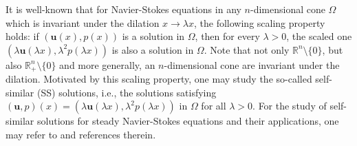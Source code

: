 \documentclass[reqno,12pt]{amsart}
\renewcommand{\div}{{\rm div \thinspace }}
\newcommand{\Bu}{{\boldsymbol{u}}}
\newcommand{\Be}{{\boldsymbol{e}}}
\begin{document}

 It is well-known that for Navier-Stokes equations in any $n$-dimensional cone $\Omega$ which is invariant under the dilation $x\to\lambda x$, the following scaling property holds: if $(\Bu(x),p(x))$ is a solution in $\Omega$, then for every $\lambda>0$, the scaled one $(\lambda \Bu(\lambda x), \lambda^2 p(\lambda x))$ is also a solution in $\Omega$. Note that not only $\mathbb{R}^n\setminus\{0\}$, but also $\mathbb{R}^n_+\setminus\{0\}$ and more generally, an $n$-dimensional cone are invariant under the dilation. 
 Motivated by this scaling property, one may study the so-called self-similar (SS) solutions, i.e., the solutions satisfying
	$(\Bu, p)(x)=(\lambda \Bu(\lambda x), \lambda^2 p(\lambda x))$ in $\Omega$ for all $\lambda>0$.
For the study of self-similar solutions for steady Navier-Stokes equations and their applications, one may refer to \cite{Tian98, LiLiYan18, Sverak11, KorolevSverak11} and references therein. 
\end{document}
